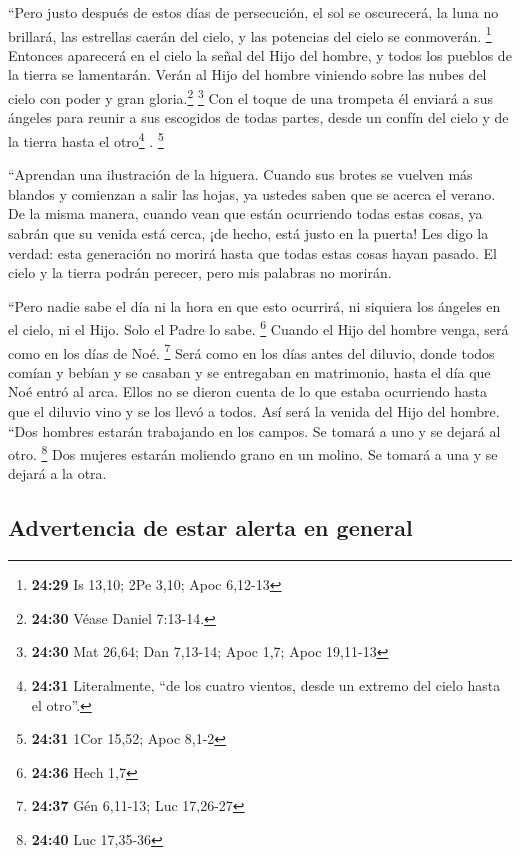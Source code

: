  ``Pero justo después de estos días de persecución, el
sol se oscurecerá, la luna no brillará, las estrellas caerán del cielo,
y las potencias del cielo se conmoverán. \footnote{\textbf{24:29} Is
  13,10; 2Pe 3,10; Apoc 6,12-13}  Entonces aparecerá en
el cielo la señal del Hijo del hombre, y todos los pueblos de la tierra
se lamentarán. Verán al Hijo del hombre viniendo sobre las nubes del
cielo con poder y gran gloria.\footnote{\textbf{24:30} Véase Daniel
  7:13-14.} \footnote{\textbf{24:30} Mat 26,64; Dan 7,13-14; Apoc 1,7;
  Apoc 19,11-13}  Con el toque de una trompeta él enviará
a sus ángeles para reunir a sus escogidos de todas partes, desde un
confín del cielo y de la tierra hasta el otro\footnote{\textbf{24:31}
  Literalmente, ``de los cuatro vientos, desde un extremo del cielo
  hasta el otro''.} . \footnote{\textbf{24:31} 1Cor 15,52; Apoc 8,1-2}

 ``Aprendan una ilustración de la higuera. Cuando sus
brotes se vuelven más blandos y comienzan a salir las hojas, ya ustedes
saben que se acerca el verano.  De la misma manera,
cuando vean que están ocurriendo todas estas cosas, ya sabrán que su
venida está cerca, ¡de hecho, está justo en la puerta! 
Les digo la verdad: esta generación no morirá hasta que todas estas
cosas hayan pasado.  El cielo y la tierra podrán perecer,
pero mis palabras no morirán.

 ``Pero nadie sabe el día ni la hora en que esto
ocurrirá, ni siquiera los ángeles en el cielo, ni el Hijo. Solo el Padre
lo sabe. \footnote{\textbf{24:36} Hech 1,7}  Cuando el
Hijo del hombre venga, será como en los días de Noé. \footnote{\textbf{24:37}
  Gén 6,11-13; Luc 17,26-27}  Será como en los días antes
del diluvio, donde todos comían y bebían y se casaban y se entregaban en
matrimonio, hasta el día que Noé entró al arca.  Ellos no
se dieron cuenta de lo que estaba ocurriendo hasta que el diluvio vino y
se los llevó a todos. Así será la venida del Hijo del hombre.
 ``Dos hombres estarán trabajando en los campos. Se
tomará a uno y se dejará al otro. \footnote{\textbf{24:40} Luc 17,35-36}
 Dos mujeres estarán moliendo grano en un molino. Se
tomará a una y se dejará a la otra.

\hypertarget{advertencia-de-estar-alerta-en-general}{%
\subsection{Advertencia de estar alerta en
general}\label{advertencia-de-estar-alerta-en-general}}

